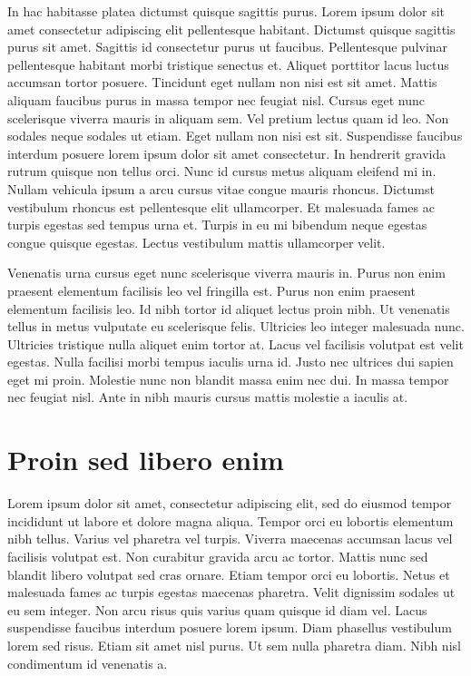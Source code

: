 \documentclass[10pt, a4paper]{article}
\numberwithin{equation}{section}
\begin{document}
In hac habitasse platea dictumst quisque sagittis purus. Lorem ipsum dolor sit amet consectetur adipiscing elit pellentesque habitant. Dictumst quisque sagittis purus sit amet. Sagittis id consectetur purus ut faucibus. Pellentesque pulvinar pellentesque habitant morbi tristique senectus et. Aliquet porttitor lacus luctus accumsan tortor posuere. Tincidunt eget nullam non nisi est sit amet. Mattis aliquam faucibus purus in massa tempor nec feugiat nisl. Cursus eget nunc scelerisque viverra mauris in aliquam sem. Vel pretium lectus quam id leo. Non sodales neque sodales ut etiam. Eget nullam non nisi est sit. Suspendisse faucibus interdum posuere lorem ipsum dolor sit amet consectetur. In hendrerit gravida rutrum quisque non tellus orci. Nunc id cursus metus aliquam eleifend mi in. Nullam vehicula ipsum a arcu cursus vitae congue mauris rhoncus. Dictumst vestibulum rhoncus est pellentesque elit ullamcorper. Et malesuada fames ac turpis egestas sed tempus urna et. Turpis in eu mi bibendum neque egestas congue quisque egestas. Lectus vestibulum mattis ullamcorper velit.

Venenatis urna cursus eget nunc scelerisque viverra mauris in. Purus non enim praesent elementum facilisis leo vel fringilla est. Purus non enim praesent elementum facilisis leo. Id nibh tortor id aliquet lectus proin nibh. Ut venenatis tellus in metus vulputate eu scelerisque felis. Ultricies leo integer malesuada nunc. Ultricies tristique nulla aliquet enim tortor at. Lacus vel facilisis volutpat est velit egestas. Nulla facilisi morbi tempus iaculis urna id. Justo nec ultrices dui sapien eget mi proin. Molestie nunc non blandit massa enim nec dui. In massa tempor nec feugiat nisl. Ante in nibh mauris cursus mattis molestie a iaculis at.


\section{Proin sed libero enim}

Lorem ipsum dolor sit amet, consectetur adipiscing elit, sed do eiusmod tempor incididunt ut labore et dolore magna aliqua. Tempor orci eu lobortis elementum nibh tellus. Varius vel pharetra vel turpis. Viverra maecenas accumsan lacus vel facilisis volutpat est. Non curabitur gravida arcu ac tortor. Mattis nunc sed blandit libero volutpat sed cras ornare. Etiam tempor orci eu lobortis. Netus et malesuada fames ac turpis egestas maecenas pharetra. Velit dignissim sodales ut eu sem integer. Non arcu risus quis varius quam quisque id diam vel. Lacus suspendisse faucibus interdum posuere lorem ipsum. Diam phasellus vestibulum lorem sed risus. Etiam sit amet nisl purus. Ut sem nulla pharetra diam. Nibh nisl condimentum id venenatis a.
\end{document}
